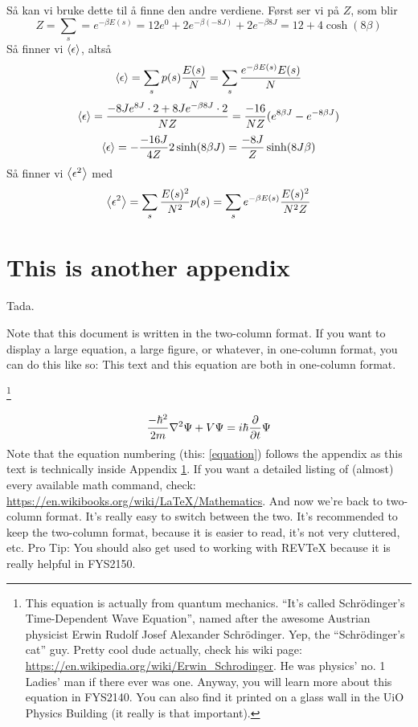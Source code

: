 \documentclass[reprint,english,notitlepage]{revtex4-2}  %
\begin{document}
Så kan vi bruke dette til å finne den andre verdiene. Først ser vi på $Z$, som blir 
$$
Z=\sum_s=e^{-\beta E(s)}=12 e^{0}+2e^{-\beta (-8J)}+2e^{-\beta 8J}=12+4\cosh(8\beta)
$$
Så finner vi $\expval{\epsilon}$, altså
$$
\expval{\epsilon}=\sum_{s}p(s)\frac{E(s)}{N}=\sum_{s}\frac{e^{-\beta E(s)}E(s)}{N}
$$
$$
\expval{\epsilon}=\frac{-8Je^{8J}\cdot 2 + 8Je^{-\beta 8J}\cdot 2}{NZ}=\frac{-16}{NZ}(e^{8\beta J}-e^{-8\beta J})$$$$\expval{\epsilon}=-\frac{-16 J}{4Z}2\sinh(8\beta J)=\frac{-8J}{Z}\sinh(8J\beta)
$$
Så finner vi $\expval{\epsilon^2}$ med 
$$
\expval{\epsilon^2}=\sum_{s}\frac{E(s)^2}{N^2}p(s)=\sum_{s}e^{-\beta E(s)}\frac{E(s)^2}{N^2Z}
$$


\section{This is another appendix}\label{appendix}
Tada.


\clearpage
Note that this document is written in the two-column format. If you want to display a large equation, a large figure, or whatever, in one-column format, you can do this like so:
\onecolumngrid
\vspace{1cm} %
This text and this equation are both in one-column format.

\footnote{This equation is actually from quantum mechanics. ``It's called Schrödinger's Time-Dependent Wave Equation'', named after the awesome Austrian physicist Erwin Rudolf Josef Alexander Schrödinger. Yep, the ``Schrödinger's cat'' guy. Pretty cool dude actually, check his wiki page: \url{https://en.wikipedia.org/wiki/Erwin_Schrodinger}. He was physics' no. 1 Ladies' man if there ever was one. Anyway, you will learn more about this equation in FYS2140. You can also find it printed on a glass wall in the UiO Physics Building (it really is that important).}

\begin{equation}\label{equation}
\frac{-\hbar^2}{2m}\laplacian{\Psi}+V\Psi=i\hbar\pdv{t}\Psi
\end{equation}
Note that the equation numbering (this: \ref{equation}) follows the appendix as this text is technically inside Appendix \ref{appendix}. If you want a detailed listing of (almost) every available math command, check: \url{https://en.wikibooks.org/wiki/LaTeX/Mathematics}.
\vspace{1cm} %
\twocolumngrid
And now we're back to two-column format. It's really easy to switch between the two. It's recommended to keep the two-column format, because it is easier to read, it's not very cluttered, etc. Pro Tip: You should also get used to working with REVTeX because it is really helpful in FYS2150.
\end{document}
